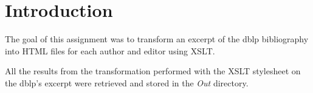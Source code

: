 \section{Introduction}

The goal of this assignment was to transform an excerpt of the dblp bibliography
into HTML files for each author and editor using XSLT.

\begin{framehint}
    All the results from the transformation performed with the XSLT stylesheet
    on the dblp's excerpt were retrieved and stored in the \emph{Out} directory.
\end{framehint}
